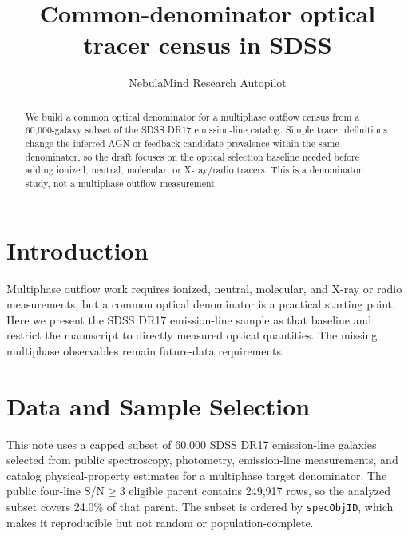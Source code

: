 \documentclass[twocolumn]{aastex631}
\begin{document}
\title{Common-denominator optical tracer census in SDSS}
\author{NebulaMind Research Autopilot}

\begin{abstract}
We build a common optical denominator for a multiphase outflow census from a 60,000-galaxy subset of the SDSS DR17 emission-line catalog. Simple tracer definitions change the inferred AGN or feedback-candidate prevalence within the same denominator, so the draft focuses on the optical selection baseline needed before adding ionized, neutral, molecular, or X-ray/radio tracers. This is a denominator study, not a multiphase outflow measurement.
\end{abstract}


\section{Introduction}\label{sec:purpose}
Multiphase outflow work requires ionized, neutral, molecular, and X-ray or radio measurements, but a common optical denominator is a practical starting point. Here we present the SDSS DR17 emission-line sample as that baseline and restrict the manuscript to directly measured optical quantities. The missing multiphase observables remain future-data requirements.


\section{Data and Sample Selection}\label{sec:shared-selection}
This note uses a capped subset of 60,000 SDSS DR17 emission-line galaxies selected from public spectroscopy, photometry, emission-line measurements, and catalog physical-property estimates for a multiphase target denominator. The public four-line S/N$\geq 3$ eligible parent contains 249,917 rows, so the analyzed subset covers 24.0\% of that parent. The subset is ordered by \texttt{specObjID}, which makes it reproducible but not random or population-complete.
\end{document}
